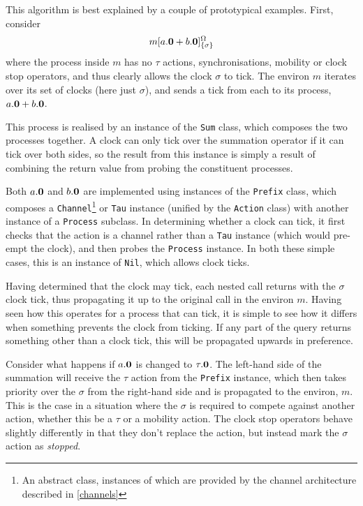 \documentclass{acm_proc_article-sp}
\begin{document}
This algorithm is best explained by a couple of prototypical examples.
First, consider 
\begin{displaymath}
{m}[ a.\textbf{0} + b.\textbf{0} ]^{\Omega}_{\{\sigma\}}
\end{displaymath}
where the process inside $m$ has no $\tau$ actions, synchronisations,
mobility or clock stop operators, and thus clearly allows the clock
$\sigma$ to tick.  The environ $m$ iterates over its set of clocks (here
just $\sigma$), and sends a tick from each to its process, $a.\textbf{0} +
b.\textbf{0}$.

This process is realised by an instance of the \texttt{Sum} class, which
composes the two processes together.  A clock can only tick over the
summation operator if it can tick over both sides, so the result from
this instance is simply a result of combining the return value from
probing the constituent processes.

Both $a.\textbf{0}$ and $b.\textbf{0}$ are implemented using instances of the
\texttt{Prefix} class, which composes a \texttt{Channel}\footnote{An
abstract class, instances of which are provided by the channel
architecture described in \ref{channels}} or \texttt{Tau} instance
(unified by the \texttt{Action} class) with another instance of a
\texttt{Process} subclass.  In determining whether a clock can tick, it
first checks that the action is a channel rather than a \texttt{Tau}
instance (which would pre-empt the clock), and then probes the
\texttt{Process} instance.  In both these simple cases, this is an
instance of \texttt{Nil}, which allows clock ticks.

Having determined that the clock may tick, each nested call returns with
the $\sigma$ clock tick, thus propagating it up to the original call in
the environ $m$.  Having seen how this operates for a process that can
tick, it is simple to see how it differs when something prevents the
clock from ticking.  If any part of the query returns something other
than a clock tick, this will be propagated upwards in preference.

Consider what happens if $a.\textbf{0}$ is changed to $\tau.\textbf{0}$.  The
left-hand side of the summation will receive the $\tau$ action from the
\texttt{Prefix} instance, which then takes priority over the $\sigma$
from the right-hand side and is propagated to the environ, $m$.  This is
the case in a situation where the $\sigma$ is required to compete
against another action, whether this be a $\tau$ or a mobility action.
The clock stop operators behave slightly differently in that they don't
replace the action, but instead mark the $\sigma$ action as
\emph{stopped}.
\end{document}
